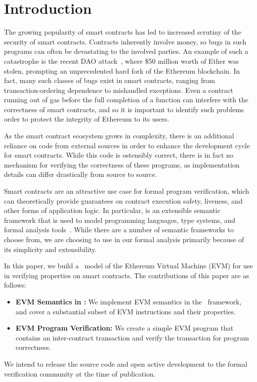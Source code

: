 \section{Introduction}
The growing popularity of smart contracts has led to increased scrutiny of
the security of smart contracts. Contracts inherently involve money, so bugs in
such programs can often be devastating to the involved parties. An example of
such a catastrophe is the recent DAO attack~\cite{dao-attack}, where \$50
million worth of Ether was stolen, prompting an unprecedented hard fork of the
Ethereum blockchain. In fact, many such
classes of bugs exist in smart contracts, ranging from transaction-ordering
dependence to mishandled exceptions. Even a contract running out of gas before
the full completion of a function can interfere with the correctness of smart
contracts, and so it is important to identify such problems order to protect the integrity of Ethereum to its users.

As the smart contract ecosystem grows in complexity, there is an additional
reliance on code from external sources in order to enhance the development cycle
for smart contracts. While this code is ostensibly correct, there is in fact no
mechanism for verifying the correctness of these programs, as implementation
details can differ drastically from source to source.

Smart contracts are an attractive use case for formal program verification, which
can theoretically provide guarantees on contract execution safety,
liveness, and other forms of application logic. In particular, \K{} is an
extensible semantic framework that is used to model programming languages, type
systems, and formal analysis tools~\cite{rosu-serbanuta-2010-jlap}. While there
are a number of semantic frameworks to choose from, we are choosing to use \K{} in
our formal analysis primarily because of its simplicity and extensibility.

In this paper, we build a \K{}~model of the Ethereum Virtual Machine (EVM) for use
in verifying properties on smart contracts. The contributions of this paper are as follows:

\begin{itemize}
\item{\bf EVM Semantics in \K{}:} We implement EVM semantics in the \K{}~framework, and
cover a substantial subset of EVM instructions and their properties.
\item{\bf EVM Program Verification:} We create a simple EVM program that
contains an inter-contract transaction and verify the transaction for
program correctness.
\end{itemize}

We intend to release the source code and open active development to the formal
verification community at the time of publication.
